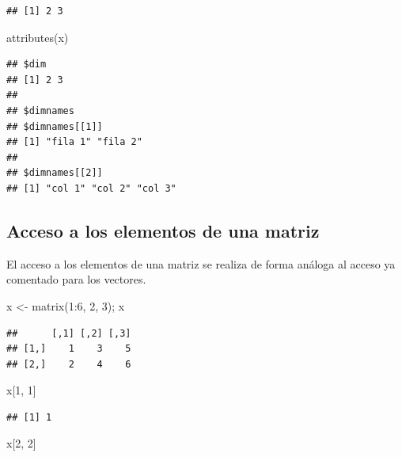 \documentclass[
]{book}
\newenvironment{Shaded}{\begin{snugshade}}{\end{snugshade}}
\newcommand{\DecValTok}[1]{\textcolor[rgb]{0.00,0.00,0.81}{#1}}
\newcommand{\FunctionTok}[1]{\textcolor[rgb]{0.00,0.00,0.00}{#1}}
\newcommand{\NormalTok}[1]{#1}
\newcommand{\OtherTok}[1]{\textcolor[rgb]{0.56,0.35,0.01}{#1}}
\newcommand{\SpecialCharTok}[1]{\textcolor[rgb]{0.00,0.00,0.00}{#1}}
\theoremstyle{break}
\theoremstyle{nonumberplain}
\begin{document}
\begin{verbatim}
## [1] 2 3
\end{verbatim}

\begin{Shaded}
\begin{Highlighting}[]
\FunctionTok{attributes}\NormalTok{(x)}
\end{Highlighting}
\end{Shaded}

\begin{verbatim}
## $dim
## [1] 2 3
## 
## $dimnames
## $dimnames[[1]]
## [1] "fila 1" "fila 2"
## 
## $dimnames[[2]]
## [1] "col 1" "col 2" "col 3"
\end{verbatim}

\hypertarget{acceso-a-los-elementos-de-una-matriz}{%
\subsection{Acceso a los elementos de una matriz}\label{acceso-a-los-elementos-de-una-matriz}}

El acceso a los elementos de una matriz se realiza de forma análoga al acceso ya comentado para los vectores.

\begin{Shaded}
\begin{Highlighting}[]
\NormalTok{x }\OtherTok{\textless{}{-}} \FunctionTok{matrix}\NormalTok{(}\DecValTok{1}\SpecialCharTok{:}\DecValTok{6}\NormalTok{, }\DecValTok{2}\NormalTok{, }\DecValTok{3}\NormalTok{); x}
\end{Highlighting}
\end{Shaded}

\begin{verbatim}
##      [,1] [,2] [,3]
## [1,]    1    3    5
## [2,]    2    4    6
\end{verbatim}

\begin{Shaded}
\begin{Highlighting}[]
\NormalTok{x[}\DecValTok{1}\NormalTok{, }\DecValTok{1}\NormalTok{]}
\end{Highlighting}
\end{Shaded}

\begin{verbatim}
## [1] 1
\end{verbatim}

\begin{Shaded}
\begin{Highlighting}[]
\NormalTok{x[}\DecValTok{2}\NormalTok{, }\DecValTok{2}\NormalTok{]}
\end{Highlighting}
\end{Shaded}
\end{document}
